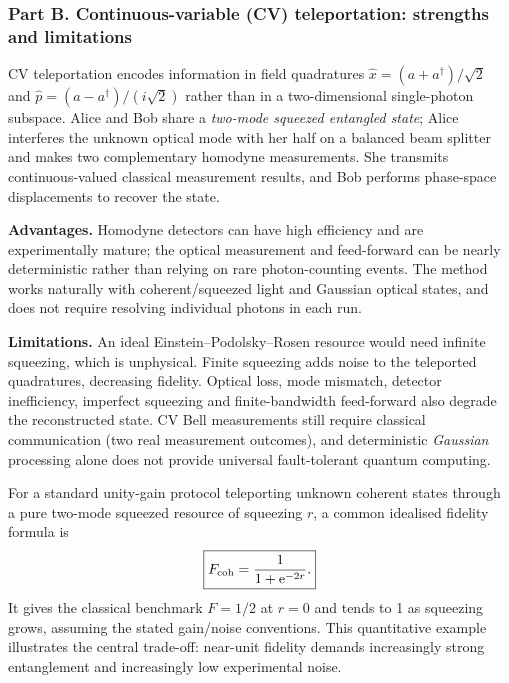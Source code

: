 \subsubsection*{Part B. Continuous-variable (CV) teleportation: strengths and limitations}
CV teleportation encodes information in field quadratures $\hat x=(a+a^\dagger)/\sqrt2$ and $\hat p=(a-a^\dagger)/(i\sqrt2)$ rather than in a two-dimensional single-photon subspace. Alice and Bob share a \emph{two-mode squeezed entangled state}; Alice interferes the unknown optical mode with her half on a balanced beam splitter and makes two complementary homodyne measurements. She transmits continuous-valued classical measurement results, and Bob performs phase-space displacements to recover the state.

\textbf{Advantages.} Homodyne detectors can have high efficiency and are experimentally mature; the optical measurement and feed-forward can be nearly deterministic rather than relying on rare photon-counting events. The method works naturally with coherent/squeezed light and Gaussian optical states, and does not require resolving individual photons in each run.

\textbf{Limitations.} An ideal Einstein--Podolsky--Rosen resource would need infinite squeezing, which is unphysical. Finite squeezing adds noise to the teleported quadratures, decreasing fidelity. Optical loss, mode mismatch, detector inefficiency, imperfect squeezing and finite-bandwidth feed-forward also degrade the reconstructed state. CV Bell measurements still require classical communication (two real measurement outcomes), and deterministic \emph{Gaussian} processing alone does not provide universal fault-tolerant quantum computing.

For a standard unity-gain protocol teleporting unknown coherent states through a pure two-mode squeezed resource of squeezing $r$, a common idealised fidelity formula is
\begin{equation}\boxed{F_{\rm coh}=\frac{1}{1+\mathrm{e}^{-2r}}.}\end{equation}
It gives the classical benchmark $F=1/2$ at $r=0$ and tends to 1 as squeezing grows, assuming the stated gain/noise conventions. This quantitative example illustrates the central trade-off: near-unit fidelity demands increasingly strong entanglement and increasingly low experimental noise.